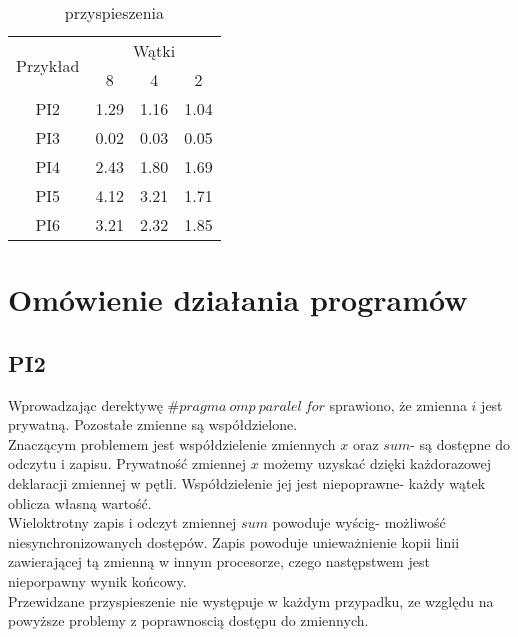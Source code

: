 \documentclass{article}
\begin{document}
\begin{table}[!htb]
\centering
\begin{tabular}{|c|l|l|l|}
\hline
\multirow{2}{*}{Przykład} & \multicolumn{3}{c|}{Wątki}                                               \\ \cline{2-4} 
                          & \multicolumn{1}{c|}{8} & \multicolumn{1}{c|}{4} & \multicolumn{1}{c|}{2} \\ \hline
PI2                       & 1.29                   & 1.16                   & 1.04                   \\ \hline
PI3                       & 0.02                   & 0.03                   & 0.05                   \\ \hline
PI4                       & 2.43                   & 1.80                   & 1.69                   \\ \hline
PI5                       & 4.12                   & 3.21                   & 1.71                   \\ \hline
PI6                       & 3.21                   & 2.32                   & 1.85                   \\ \hline
\end{tabular}
\caption{przyspieszenia}
\end{table}

\newpage

\section{Omówienie działania programów}
\subsection{PI2}
Wprowadzając derektywę $\#pragma\:omp\:paralel\:for$ sprawiono, że zmienna $i$ jest prywatną. Pozostałe zmienne są współdzielone.\\
Znaczącym problemem jest współdzielenie zmiennych $x$ oraz $sum$- są dostępne do odczytu i zapisu. Prywatność zmiennej $x$ możemy uzyskać dzięki każdorazowej deklaracji zmiennej w pętli. Współdzielenie jej jest niepoprawne- każdy wątek oblicza własną wartość. \\
Wieloktrotny zapis i odczyt zmiennej $sum$ powoduje wyścig- możliwość niesynchronizowanych dostępów. Zapis powoduje unieważnienie kopii linii zawierającej tą zmienną w innym procesorze, czego następstwem jest nieporpawny wynik końcowy.\\
Przewidzane przyspieszenie nie występuje w każdym przypadku, ze względu na powyższe problemy z poprawnoscią dostępu do zmiennych. 
\end{document}
